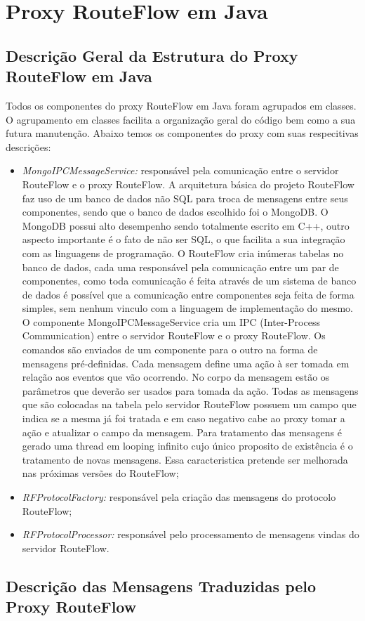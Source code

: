 \chapter{Proxy RouteFlow em Java}

\section{Descrição Geral da Estrutura do Proxy RouteFlow em Java}

Todos os componentes do proxy RouteFlow em Java foram agrupados em classes. O agrupamento em classes facilita a 
organização geral do código bem como a sua futura manutenção. Abaixo temos os componentes do proxy com suas respecitivas descrições:

\begin{itemize}
\item \textit{MongoIPCMessageService:} responsável pela comunicação entre o servidor RouteFlow e o proxy RouteFlow. A arquitetura básica do projeto RouteFlow faz uso de um banco de dados não SQL para troca de mensagens entre seus componentes, sendo que o banco de dados escolhido foi o MongoDB. O MongoDB possui alto desempenho sendo totalmente escrito em C++, outro aspecto importante é o fato de não ser SQL, o que facilita a sua integração com as linguagens de programação. O RouteFlow cria inúmeras tabelas no banco de dados, cada uma responsável pela comunicação entre um par de componentes, como toda comunicação é feita através de um sistema de banco de dados é possível que a comunicação entre componentes seja feita de forma simples, sem nenhum vinculo com a linguagem de implementação do mesmo. O componente MongoIPCMessageService cria um IPC (Inter-Process Communication) entre o servidor RouteFlow e o proxy RouteFlow. Os comandos são enviados de um componente para o outro na forma de mensagens pré-definidas. Cada mensagem define uma ação à ser tomada em relação aos eventos que vão ocorrendo. No corpo da mensagem estão os parâmetros que deverão ser usados para tomada da ação. Todas as mensagens que são colocadas na tabela pelo servidor RouteFlow possuem um campo que indica se a mesma já foi tratada e em caso negativo cabe ao proxy tomar a ação e atualizar o campo da mensagem. Para tratamento das mensagens é gerado uma thread em looping infinito cujo único proposito de existência é o tratamento de novas mensagens. Essa caracteristica pretende ser melhorada nas próximas versões do RouteFlow;
\item \textit{RFProtocolFactory:} responsável pela criação das mensagens do protocolo RouteFlow;
\item \textit{RFProtocolProcessor:} responsável pelo processamento de mensagens vindas do servidor RouteFlow.
\end{itemize} 

\section{Descrição das Mensagens Traduzidas pelo Proxy RouteFlow}

